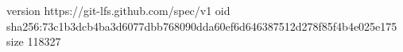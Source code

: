 version https://git-lfs.github.com/spec/v1
oid sha256:73c1b3dcb4ba3d6077dbb768090dda60ef6d646387512d278f85f4b4e025e175
size 118327
